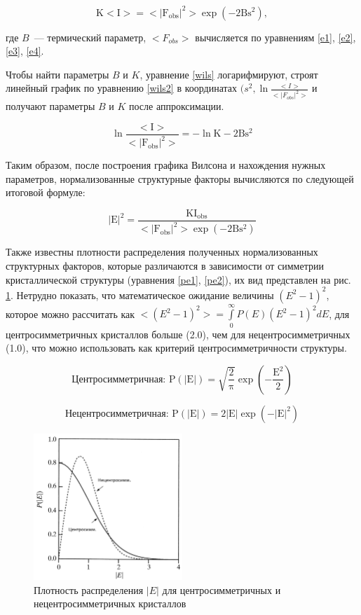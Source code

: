 \begin{equation}\label{wils}
	\mathrm{K<I> = <|F_{obs}|^2>\exp(-2Bs^2)},
\end{equation}

где $B$~--- термический параметр, $<F_{obs}>$ вычисляется по уравнениям \ref{e1}, \ref{e2}, \ref{e3}, \ref{e4}.

Чтобы найти параметры $B$ и $K$, уравнение \ref{wils} логарифмируют, строят линейный график по уравнению \ref{wils2} в координатах $(s^2,\ln\frac{<I>}{<|F_{obs}|^2>}$ и получают параметры $B$ и $K$ после аппроксимации.

\begin{equation}\label{wils2}
	\mathrm{\ln\frac{<I>}{<|F_{obs}|^2>} = -\ln K-2Bs^2}
\end{equation}

Таким образом, после построения графика Вилсона и нахождения нужных параметров, нормализованные структурные факторы вычисляются по следующей итоговой формуле:

\begin{equation}
	\mathrm{|E|^2 = \frac{KI_{obs}}{<|F_{obs}|^2>\exp(-2Bs^2)}}
\end{equation}

Также известны \cite{giacovazzo_international_2010} плотности распределения полученных нормализованных структурных факторов, которые различаются в зависимости от симметрии кристаллической структуры (уравнения \ref{pe1}, \ref{pe2}), их вид представлен на рис. \ref{eimage}. Нетрудно показать, что математическое ожидание величины $(E^2-1)^2$, которое можно рассчитать как $<(E^2-1)^2> = \int\limits_0^\infty P(E)(E^2-1)^2dE$, для центросимметричных кристаллов больше (2.0), чем для нецентросимметричных (1.0), что можно использовать как критерий центросимметричности структуры.

\begin{equation}\label{pe1}
	\mathrm{\text{Центросимметричная: }P(|E|)=\sqrt{\frac{2}{\pi}}\exp(-\frac{E^2}{2})}
\end{equation}

\begin{equation}\label{pe2}
	\mathrm{\text{Нецентросимметричная: }P(|E|) = 2|E|\exp(-|E|^2)}
\end{equation}

\begin{figure}[H]
	\centering
	\includegraphics[width=0.5\textwidth]{figures/eimage.png}\hfill
	\caption{Плотность распределения $|E|$ для центросимметричных и нецентросимметричных кристаллов \cite{giacovazzo_international_2010}}
	\label{eimage}
\end{figure}

